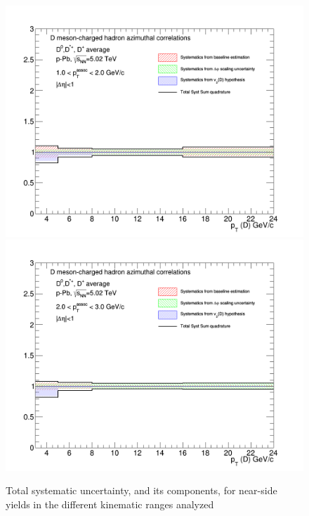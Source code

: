 \begin{figure}[!htbp]
{\includegraphics[width=0.49\linewidth, height=0.33\linewidth]{figures/FitOutput/TotalSystematicSourcesNSYield_pthad1dotto2dot.png}}
{\includegraphics[width=0.49\linewidth, height=0.33\linewidth]{figures/FitOutput/TotalSystematicSourcesNSYield_pthad2dotto3dot.png}}
\caption{Total systematic uncertainty, and its components, for near-side yields in the different kinematic ranges analyzed}
\label{fig:NSyieldTotalUnc}
\end{figure}


